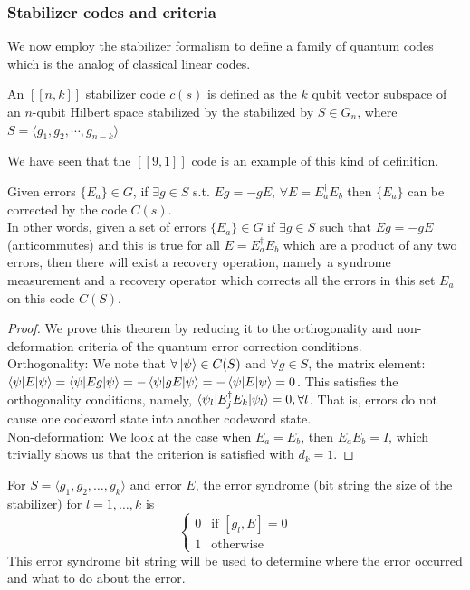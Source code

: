\subsubsection{Stabilizer codes and criteria}
We now employ the stabilizer formalism to define a family of quantum codes which is the analog of classical linear codes. 
\begin{definition}
    An $[[n,k]]$ stabilizer code $c(s)$ is defined as the $k$ qubit vector subspace of an $n$-qubit Hilbert space stabilized by the stabilized by $S \in G_n$, where $S = \langle g_1, g_2, \cdots, g_{n-k}\rangle$
\end{definition}
We have seen that the $[[9,1]]$ code is an example of this kind of definition. 
\begin{theorem}
    Given errors $\{E_a\} \in G$, if  $\exists g \in S$ s.t. $Eg = -gE$, $\forall E = E_a^\dagger E_b$ then $\{E_a\}$ can be corrected by the code $C(s)$. \\
    In other words, given a set of errors $\{E_a\} \in G$ if $\exists g \in S$ such that $Eg = -gE$ (anticommutes) and this is true for all $E = E_a^\dagger E_b$ which are a product of any two errors, then there will exist a recovery operation, namely a syndrome measurement and a recovery operator which corrects all the errors in this set $E_a$ on this code $C(S)$. 
\end{theorem}
\begin{proof}
    We prove this theorem by reducing it to the orthogonality and non-deformation criteria of the quantum error correction conditions. \\
    
    Orthogonality: We note that $\forall \ket{\psi} \in C(S)$ and $\forall g \in S$, the matrix element: $\braket{\psi|E|\psi} = \braket{\psi|Eg|\psi} = - \braket{\psi|gE|\psi} = - \braket{\psi|E|\psi} = 0$. This satisfies the orthogonality conditions, namely, $\braket{\psi_l | E_j^\dagger E_k |\psi_l} = 0, \forall l$. That is, errors do not cause one codeword state into another codeword state. \\

    Non-deformation: We look at the case when $E_a = E_b$, then $E_aE_b = I$, which trivially shows us that the criterion is satisfied with $d_k = 1$. 
\end{proof}
\begin{definition}
    For $S = \langle g_1, g_2, \ldots, g_k\rangle$ and error $E$, the error syndrome (bit string the size of the stabilizer) for $l = 1,\ldots, k $ is
    \begin{equation}
        \begin{cases}
            0 & \text{if } [g_l,E] = 0 \\
            1 & \text{otherwise}
        \end{cases}
    \end{equation}
    This error syndrome bit string will be used to determine where the error occurred and what to do about the error. 
\end{definition}
